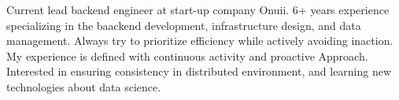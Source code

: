 

\begin{cvparagraph}
Current lead backend engineer at start-up company Onuii. 6+ years experience specializing in the baackend development, infrastructure design, and data management. Always try to prioritize efficiency while actively avoiding inaction. My experience is defined with continuous activity and proactive Approach. Interested in ensuring consistency in distributed environment, and learning new technologies about data science.

\end{cvparagraph}
